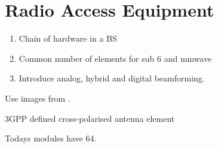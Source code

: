 \section{Radio Access Equipment}
\label{sec:radio_access_equipment}


\begin{enumerate}
    \item Chain of hardware in a BS
    \item Common number of elements for sub 6 and mmwave %
    \item Introduce analog, hybrid and digital beamforming.
\end{enumerate}



Use images from \cite{phdthesis}.

3GPP defined cross-polarised antenna element \cite{3gpp_antennas}



Todays modules have 64.%
